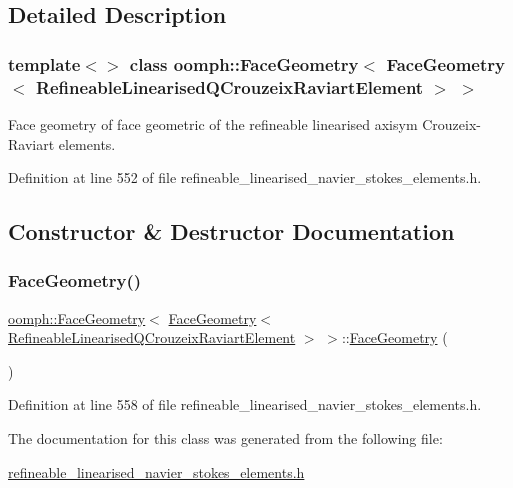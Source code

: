 \subsection{Detailed Description}
\subsubsection*{template$<$$>$\newline
class oomph\+::\+Face\+Geometry$<$ Face\+Geometry$<$ Refineable\+Linearised\+Q\+Crouzeix\+Raviart\+Element $>$ $>$}

Face geometry of face geometric of the refineable linearised axisym Crouzeix-\/\+Raviart elements. 

Definition at line 552 of file refineable\+\_\+linearised\+\_\+navier\+\_\+stokes\+\_\+elements.\+h.



\subsection{Constructor \& Destructor Documentation}
\mbox{\label{classoomph_1_1FaceGeometry_3_01FaceGeometry_3_01RefineableLinearisedQCrouzeixRaviartElement_01_4_01_4_a6b2393a22f7935b2b92bb8d3ab3c2c5c}} 
\subsubsection{\texorpdfstring{Face\+Geometry()}{FaceGeometry()}}
{\footnotesize\ttfamily \hyperlink{classoomph_1_1FaceGeometry}{oomph\+::\+Face\+Geometry}$<$ \hyperlink{classoomph_1_1FaceGeometry}{Face\+Geometry}$<$ \hyperlink{classoomph_1_1RefineableLinearisedQCrouzeixRaviartElement}{Refineable\+Linearised\+Q\+Crouzeix\+Raviart\+Element} $>$ $>$\+::\hyperlink{classoomph_1_1FaceGeometry}{Face\+Geometry} (\begin{DoxyParamCaption}{ }\end{DoxyParamCaption})\hspace{0.3cm}{\ttfamily [inline]}}



Definition at line 558 of file refineable\+\_\+linearised\+\_\+navier\+\_\+stokes\+\_\+elements.\+h.



The documentation for this class was generated from the following file\+:\begin{DoxyCompactItemize}
\item 
\hyperlink{refineable__linearised__navier__stokes__elements_8h}{refineable\+\_\+linearised\+\_\+navier\+\_\+stokes\+\_\+elements.\+h}\end{DoxyCompactItemize}
